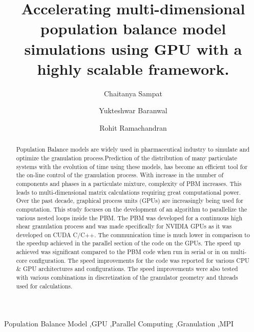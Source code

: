 \documentclass[preprint,10pt,authoryear]{elsarticle}
\begin{document}
\begin{frontmatter}
\title{Accelerating multi-dimensional population balance model simulations using GPU with a highly scalable framework.}


\author[label1]{Chaitanya Sampat}
\author[label1]{Yukteshwar Baranwal}
\address[label1]{Chemical and Biochemical Engineering, Rutgers University, Piscataway, NJ, USA - 08854}
\author[label1]{Rohit Ramachandran}

\begin{abstract}
Population Balance models are widely used in pharmaceutical industry to simulate
and optimize the granulation process.Prediction of the distribution of many 
particulate systems with the evolution of time using these models, has become an 
efficient tool for the on-line control of the granulation process. 
With increase in the number of components and phases in a particulate mixture, 
complexity of PBM increases. This leads to multi-dimensional matrix calculations 
requiring great computational power. Over the past decade, graphical process 
units (GPUs) are increasingly being used for computation. This study focuses on the 
development of an algorithm to parallelize the various nested loops inside the PBM. 
The PBM was developed for a continuous high shear granulation process and was made 
specifically for NVIDIA GPUs as it was developed on CUDA C/C++. The communication 
time is much lower in comparison to the speedup achieved in the parallel section 
of the code on the GPUs. The speed up achieved was significant compared to the PBM 
code when run in serial or in on multi-core configuration. The speed improvements 
for the code was reported for various CPU \& GPU architectures and configurations. 
The speed improvements were also tested with various combinations in 
discretization of the granulator geometry and threads used for calculations. 
\end{abstract}

\begin{keyword}
Population Balance Model \sep GPU \sep Parallel Computing \sep Granulation \sep MPI
\end{keyword}

\end{frontmatter}
\end{document}

